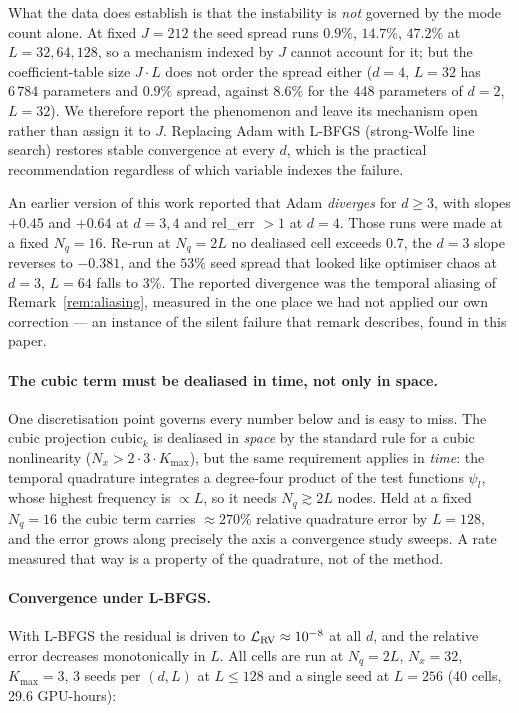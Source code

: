 What the data does establish is that the instability is \emph{not}
governed by the mode count alone. At fixed $J = 212$ the seed spread runs
$0.9\%$, $14.7\%$, $47.2\%$ at $L = 32, 64, 128$, so a mechanism indexed
by $J$ cannot account for it; but the coefficient-table size $J \cdot L$
does not order the spread either ($d = 4$, $L = 32$ has $6\,784$
parameters and $0.9\%$ spread, against $8.6\%$ for the $448$ parameters of
$d = 2$, $L = 32$). We therefore report the phenomenon and leave its
mechanism open rather than assign it to $J$. Replacing Adam with L-BFGS
(strong-Wolfe line search) restores stable convergence at every $d$, which
is the practical recommendation regardless of which variable indexes the
failure.

\begin{remark}
An earlier version of this work reported that Adam \emph{diverges} for
$d \ge 3$, with slopes $+0.45$ and $+0.64$ at $d = 3, 4$ and
rel\_err $> 1$ at $d = 4$. Those runs were made at a fixed $N_q = 16$.
Re-run at $N_q = 2L$ no dealiased cell exceeds $0.7$, the $d = 3$ slope
reverses to $-0.381$, and the $53\%$ seed spread that looked like
optimiser chaos at $d = 3$, $L = 64$ falls to $3\%$. The reported
divergence was the temporal aliasing of
Remark~\ref{rem:aliasing}, measured in the one place we had not applied
our own correction --- an instance of the silent failure that remark
describes, found in this paper.
\end{remark}

\paragraph{The cubic term must be dealiased in time, not only in space.}
One discretisation point governs every number below and is easy to miss.
The cubic projection $\mathrm{cubic}_k$ is dealiased in \emph{space} by
the standard rule for a cubic nonlinearity ($N_x > 2 \cdot 3 \cdot
K_{\max}$), but the same requirement applies in \emph{time}: the
temporal quadrature integrates a degree-four product of the test
functions $\psi_l$, whose highest frequency is $\propto L$, so it needs
$N_q \gtrsim 2L$ nodes. Held at a fixed $N_q = 16$ the cubic term
carries $\approx 270\%$ relative quadrature error by $L = 128$, and the
error grows along precisely the axis a convergence study sweeps. A rate
measured that way is a property of the quadrature, not of the method.

\paragraph{Convergence under L-BFGS.}
With L-BFGS the residual is driven to $\mathcal{L}_{\rm RV} \approx
10^{-8}$ at all $d$, and the relative error decreases monotonically in
$L$. All cells are run at $N_q = 2L$, $N_x = 32$, $K_{\max} = 3$, 3
seeds per $(d, L)$ at $L \le 128$ and a single seed at $L = 256$
(40 cells, 29.6 GPU-hours):

